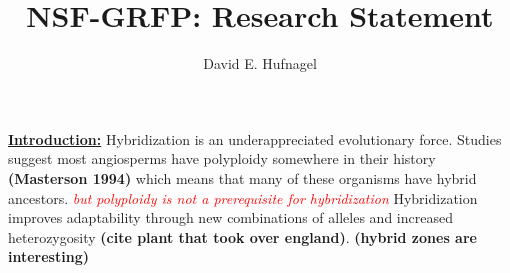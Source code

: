 \documentclass[12pt]{amsart}
\title{NSF-GRFP: Research Statement}
\author{David E. Hufnagel}
\newcommand{\mbh}[1]{\textcolor{red}{ \emph{\scriptsize  #1}} }
\begin{document}
\maketitle

\textbf{\underline{Introduction:} }
Hybridization is an underappreciated evolutionary force.
Studies suggest most angiosperms have polyploidy somewhere in their history \textbf{(Masterson 1994)} which means that many of these organisms have hybrid ancestors. \mbh{but polyploidy is not a prerequisite for hybridization}
Hybridization improves adaptability through new combinations of alleles and increased heterozygosity \textbf{(cite plant that took over england)}. \textbf{(hybrid zones are interesting)}
\end{document}
